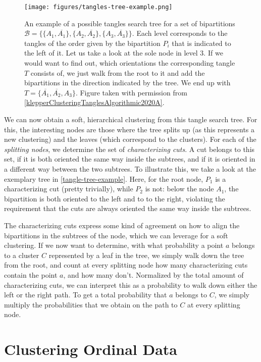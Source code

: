 \begin{figure}[h]
    \centering
    \texttt{[image: figures/tangles-tree-example.png]}
    \caption{An example of a possible tangles search tree for a set of bipartitions $\mathcal{B} = \{\{A_1, \overline{A_1}\}, \{A_2, \overline{A_2}\}, \{A_3, \overline{A_3}\} \}$. 
        Each level corresponds to the tangles of the order given by the bipartition $P_i$ that is indicated to the left of it.
        Let us take a look at the sole node in level 3. If we would want to find out, which orientations the corresponding tangle $T$ consists of, we just walk from
        the root to it and add the bipartitions in the direction indicated by the tree. We end up with $T = \{\overline{A_1}, \overline{A_2}, A_3\}$. 
        Figure taken with permission from \autoref{klepperClusteringTanglesAlgorithmic2020A}.}
    \label{fig:figures-tangles-tree-example}
\end{figure}

We can now obtain a soft, hierarchical clustering from this tangle search tree. For this, the interesting nodes are those
where the tree splits up (as this represents a new clustering) and the leaves (which correspond to the clusters). 
For each of the \textit{splitting nodes}, we determine the set of \textit{characterizing cuts}.
A cut belongs to this set, if it is both oriented the same way inside the subtrees, and if it is oriented in a different way between the two subtrees.
To illustrate this, we take a look at the exemplary tree in \autoref{tangle-tree-example}. Here, for the root node, $P_1$ is a characterizing cut (pretty trivially),
while $P_2$ is not: below the node $A_1$, the bipartition is both oriented to the left and to to the right, violating the requirement that the cuts are always oriented
the same way inside the subtrees. 

The characterizing cuts express some kind of agreement on how to align the bipartitions in the subtrees of the node, which we can leverage 
for a soft clustering. If we now want to determine, with what probability a point $a$ belongs to a cluster $C$ represented by a leaf in the tree, we simply walk down 
the tree from the root, and count at every splitting node how many characterizing cuts contain the point $a$, and how many don't. Normalized by the total amount of
characterizing cuts, we can interpret this as a probability to walk down either the left or the right path. To get a total probability that $a$ belongs to $C$, 
we simply multiply the probabilities that we obtain on the path to $C$ at every splitting node.
    

\section{Clustering Ordinal Data}
